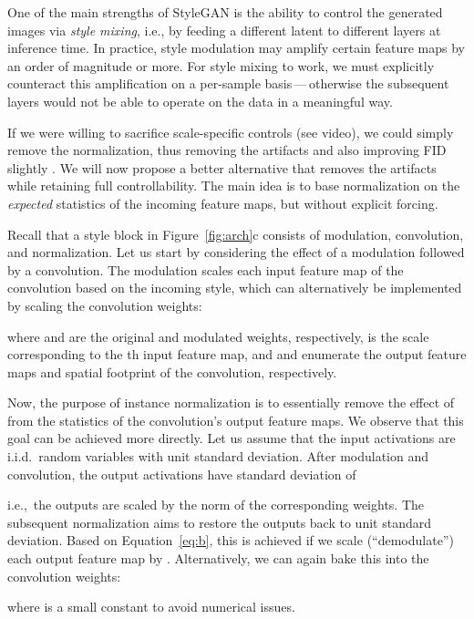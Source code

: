 \documentclass[10pt,twocolumn,letterpaper]{article}
\newcommand{\FINAL}[2][]{#2}
\begin{document}
\FINAL{One of the main strengths of StyleGAN is the ability to control the generated images via \emph{style mixing}, i.e., by feeding a different latent  to different layers at inference time. In practice, style modulation may amplify certain feature maps by an order of magnitude or more.
For style mixing to work, we must explicitly counteract this amplification on a per-sample basis\,---\,otherwise the subsequent layers would not be able to operate on the data in a meaningful way.

If we were willing to sacrifice scale-specific controls (see video), we could simply remove the normalization, thus removing the artifacts and also improving FID slightly \cite{Tuomas2019}.
We will now propose a better alternative that removes the artifacts while retaining full controllability.}
The main idea is to base normalization on the \emph{expected} statistics of the incoming feature maps, but without explicit forcing.

Recall that a style block in Figure~\ref{fig:arch}c consists of modulation, convolution, and normalization. 
Let us start by considering the effect of a modulation followed by a convolution. The modulation scales each input feature map of the convolution based on the incoming style, which can alternatively be implemented by scaling the convolution weights:

where  and  are the original and modulated weights, respectively,  is the scale corresponding to the th input feature map, and  and  enumerate the output feature maps and spatial footprint of the convolution, respectively.

Now, the purpose of instance normalization is to essentially remove the effect of  from the statistics of the convolution's output feature maps.
We observe that this goal can be achieved more directly. Let us assume that the input activations are i.i.d.~random variables with unit standard deviation. After modulation and convolution, the output activations have standard deviation of

i.e.,~the outputs are scaled by the  norm of the corresponding weights. The subsequent normalization aims to restore the outputs back to unit standard deviation.
Based on Equation~\ref{eq:b}, this is achieved if we scale (``demodulate'') each output feature map  by  . Alternatively, we can again bake this into the convolution weights:

where  is a small constant to avoid numerical issues.
\end{document}

